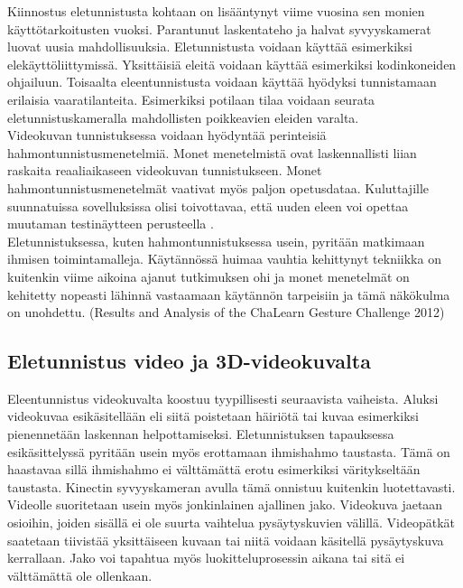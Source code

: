 Kiinnostus eletunnistusta kohtaan on lisääntynyt viime vuosina sen monien käyttötarkoitusten vuoksi.
Parantunut laskentateho ja halvat syvyyskamerat luovat uusia mahdollisuuksia.\citep {6239178}
Eletunnistusta voidaan käyttää esimerkiksi elekäyttöliittymissä. \citep {1251144} Yksittäisiä eleitä voidaan käyttää esimerkiksi kodinkoneiden ohjailuun. Toisaalta eleentunnistusta voidaan käyttää hyödyksi tunnistamaan
erilaisia vaaratilanteita. Esimerkiksi potilaan tilaa voidaan seurata eletunnistuskameralla mahdollisten poikkeavien eleiden varalta.
\\

Videokuvan tunnistuksessa voidaan hyödyntää perinteisiä hahmontunnistusmenetelmiä. Monet menetelmistä ovat laskennallisti liian raskaita 
reaaliaikaseen videokuvan tunnistukseen. \citep {1251144} Monet hahmontunnistusmenetelmät vaativat myös paljon opetusdataa. Kuluttajille suunnatuissa
sovelluksissa olisi toivottavaa, että uuden eleen voi opettaa muutaman testinäytteen perusteella \citep {1251144}.\\

Eletunnistuksessa, kuten hahmontunnistuksessa usein, pyritään matkimaan ihmisen toimintamalleja. Käytännössä huimaa vauhtia kehittynyt tekniikka on kuitenkin
viime aikoina ajanut tutkimuksen ohi ja monet menetelmät on kehitetty nopeasti lähinnä vastaamaan käytännön tarpeisiin ja tämä näkökulma on unohdettu. (Results and Analysis of the ChaLearn Gesture Challenge 2012)


\subsection{Eletunnistus video ja 3D-videokuvalta}

Eleentunnistus videokuvalta koostuu tyypillisesti seuraavista vaiheista. Aluksi videokuvaa esikäsitellään eli siitä poistetaan häiriötä tai kuvaa esimerkiksi 
pienennetään laskennan helpottamiseksi. Eletunnistuksen tapauksessa esikäsittelyssä pyritään usein myös erottamaan ihmishahmo taustasta. Tämä on haastavaa sillä
ihmishahmo ei välttämättä erotu esimerkiksi väritykseltään taustasta. Kinectin syvyyskameran avulla tämä onnistuu kuitenkin luotettavasti.
Videolle suoritetaan usein myös jonkinlainen ajallinen jako. Videokuva jaetaan osioihin, joiden sisällä ei ole suurta vaihtelua pysäytyskuvien välillä. Videopätkät saatetaan 
tiivistää yksittäiseen kuvaan tai niitä voidaan käsitellä pysäytyskuva kerrallaan. Jako voi tapahtua myös luokitteluprosessin aikana tai 
sitä ei välttämättä ole ollenkaan.\\

